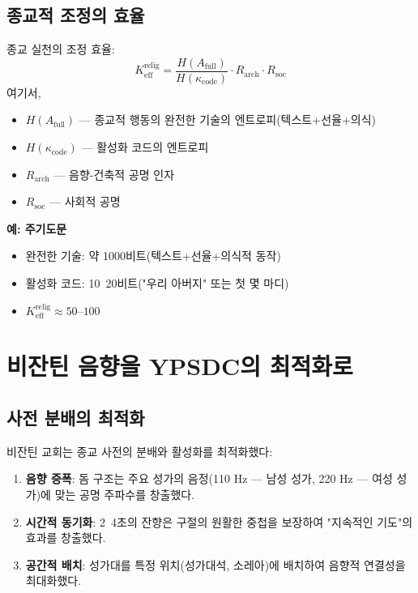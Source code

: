 \documentclass[12pt,a4paper]{article}
\begin{document}
	\subsection{종교적 조정의 효율}
	
	종교 실천의 조정 효율:
	\[
	K_{\mathrm{eff}}^{\mathrm{relig}} = \frac{H(A_{\mathrm{full}})}{H(\kappa_{\mathrm{code}})} \cdot R_{\mathrm{arch}} \cdot R_{\mathrm{soc}}
	\]
	여기서,
	\begin{itemize}
		\item $H(A_{\mathrm{full}})$ — 종교적 행동의 완전한 기술의 엔트로피(텍스트+선율+의식)
		\item $H(\kappa_{\mathrm{code}})$ — 활성화 코드의 엔트로피
		\item $R_{\mathrm{arch}}$ — 음향-건축적 공명 인자
		\item $R_{\mathrm{soc}}$ — 사회적 공명
	\end{itemize}
	
	\textbf{예: 주기도문}
	\begin{itemize}
		\item 완전한 기술: 약 1000비트(텍스트+선율+의식적 동작)
		\item 활성화 코드: 10~20비트("우리 아버지" 또는 첫 몇 마디)
		\item $K_{\mathrm{eff}}^{\mathrm{relig}} \approx 50$–$100$
	\end{itemize}
	
	\section{비잔틴 음향을 YPSDC의 최적화로}
	
	\subsection{사전 분배의 최적화}
	
	비잔틴 교회는 종교 사전의 분배와 활성화를 최적화했다:
	
	\begin{enumerate}
		\item \textbf{음향 증폭}: 돔 구조는 주요 성가의 음정(110 Hz — 남성 성가, 220 Hz — 여성 성가)에 맞는 공명 주파수를 창출했다.
		\item \textbf{시간적 동기화}: 2~4초의 잔향은 구절의 원활한 중첩을 보장하여 "지속적인 기도"의 효과를 창출했다.
		\item \textbf{공간적 배치}: 성가대를 특정 위치(성가대석, 소레아)에 배치하여 음향적 연결성을 최대화했다.
	\end{enumerate}
	
\end{document}
